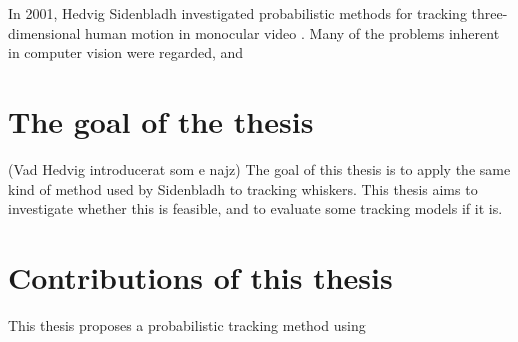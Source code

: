 In 2001, Hedvig Sidenbladh investigated probabilistic methods for tracking three-dimensional human motion in monocular video \cite{Hedvig}. Many of the problems inherent in computer vision were regarded, and

\section{The goal of the thesis}

(Vad Hedvig introducerat som e najz) The goal of this thesis is to apply the same kind of method used by Sidenbladh to tracking whiskers. This thesis aims to investigate whether this is feasible, and to evaluate some tracking models if it is.

\section{Contributions of this thesis}

This thesis proposes a probabilistic tracking method using

